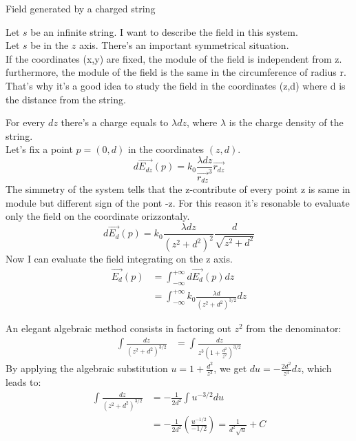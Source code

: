 \documentclass{article}
\begin{document}
\begin{xpl}{Field generated by a charged string}

  Let $s$ be an infinite string. I want to describe the field in this system.\\ 
  Let $s$ be in the $z$ axis. There's an important symmetrical situation.\\ 
  If the coordinates (x,y) are fixed, the module of the field is independent from z.\\ 
  furthermore, the module of the field is the same in the circumference of radius r.\\ 
  That's why it's a good idea to study the field in the coordinates (z,d) where d is the distance from the string.
  
  For every $dz$ there's a charge equals to $\lambda dz$, where $\lambda$ is the charge density of the string.\\ 
  Let's fix a point $p=(0,d)$ in the coordinates $(z,d)$.
  $$ d \overrightarrow{E_{dz}}(p) = k_0\frac{\lambda dz}{\overrightarrow{r_{dz}}^3}\overrightarrow{r_{dz}} $$
  The simmetry of the system tells that the z-contribute of every point z is same in module 
  but different sign of the pont -z. For this reason it's resonable to evaluate 
  only the field on the coordinate orizzontaly.
  $$ d\overrightarrow{E_d}(p) =  k_0\frac{\lambda dz}{(z^2 + d^2)^2}\frac{d}{\sqrt{z^2 + d^2}}$$
  Now I can evaluate the field integrating on the z axis.
  \begin{align*}
    \overrightarrow{E_d}(p) &=\int^{+\infty}_{-\infty}d\overrightarrow{E_d}(p)dz \\ 
                            &=\int^{+\infty}_{-\infty}k_0\frac{\lambda d}{(z^2 + d^2)^{3/2}}dz 
  \end{align*}
  \begin{note}
    An elegant algebraic method consists in factoring out $z^2$ from the denominator:
    \begin{align*}
      \int \frac{dz}{(z^2 + d^2)^{3/2}} &= \int \frac{dz}{z^3 \left(1 + \frac{d^2}{z^2}\right)^{3/2}}
    \end{align*}
    By applying the algebraic substitution $u = 1 + \frac{d^2}{z^2}$, we get $du = -\frac{2d^2}{z^3}dz$, which leads to:
    \begin{align*}
      \int \frac{dz}{(z^2 + d^2)^{3/2}} &= -\frac{1}{2d^2} \int u^{-3/2} du \\
                                   &= -\frac{1}{2d^2} \left( \frac{u^{-1/2}}{-1/2} \right) = \frac{1}{d^2\sqrt{u}} + C \\

\end{align*}
\end{note}
\end{xpl}
\end{document}
